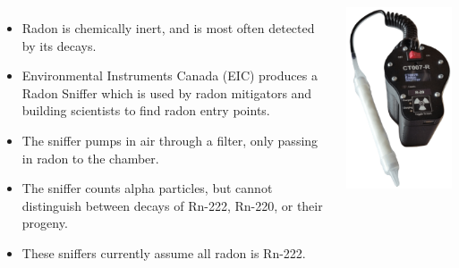 \documentclass{beamer}
\begin{document}
\begin{frame}{}

\begin{columns}


\begin{itemize}
\item Radon is chemically inert, and is most often detected by its decays.
\item Environmental Instruments Canada (EIC) produces a Radon Sniffer which is used by radon mitigators and building scientists to find radon entry points.
\item The sniffer pumps in air through a filter, only passing in radon to the chamber.
\item The sniffer counts alpha particles, but cannot distinguish between decays of Rn-222, Rn-220, or their progeny.
\item These sniffers currently assume all radon is Rn-222.
\end{itemize}

\includegraphics[scale=0.4]{images/CT007R.png}
\end{columns}


\end{frame}
\end{document}
